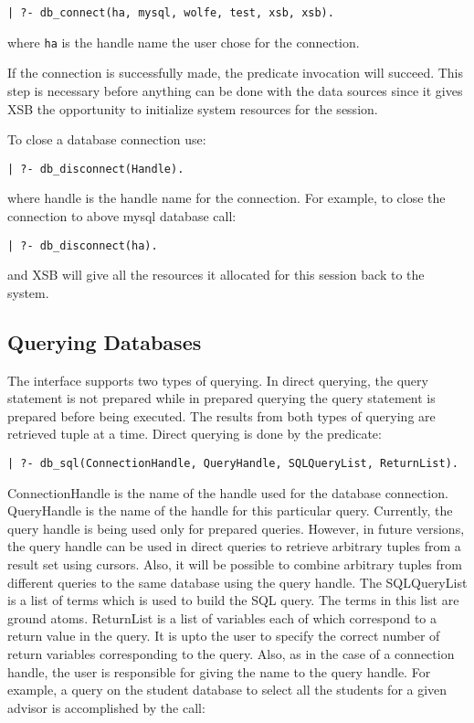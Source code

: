 \begin{verbatim}
| ?- db_connect(ha, mysql, wolfe, test, xsb, xsb).
\end{verbatim}

where {\tt ha} is the handle name the user chose for the connection.

If the connection is successfully made, the predicate invocation will
succeed.  This step is necessary before anything can be done with the
data sources since it gives XSB the opportunity to initialize system
resources for the session.

To close a database connection use:

\begin{verbatim}
| ?- db_disconnect(Handle).
\end{verbatim}

where handle is the handle name for the connection. For example, 
to close the connection to above mysql database call:

\begin{verbatim}
| ?- db_disconnect(ha).
\end{verbatim}

and XSB will give all the resources it allocated for this session back
to the system.


\subsection{Querying Databases}

The interface supports two types of querying. In direct querying, the
query statement is not prepared while in prepared querying the query
statement is prepared before being executed. The results from
both types of querying are retrieved tuple at a time.
Direct querying is done by the predicate:

\begin{verbatim}
| ?- db_sql(ConnectionHandle, QueryHandle, SQLQueryList, ReturnList).
\end{verbatim}

ConnectionHandle is the name of the handle used for the database connection.
QueryHandle is the name of the handle for this particular query. 
Currently, the query handle is being used only for prepared queries. 
However, in future versions, the query handle can be used in direct
queries to retrieve arbitrary tuples from a result set using cursors.
Also, it will be possible to combine arbitrary tuples from different 
queries to the same database using the query handle.
The SQLQueryList is a list of terms which is used to build the SQL query.
The terms in this list are ground atoms. ReturnList is a list of 
variables each of which correspond to a return value in the query.
It is upto the user to specify the correct number of return variables 
corresponding to the query. Also, as in the case of a connection handle, 
the user is responsible for giving the name to the query handle.
For example, a query on the student database to select all the students
for a given advisor is accomplished by the call:

